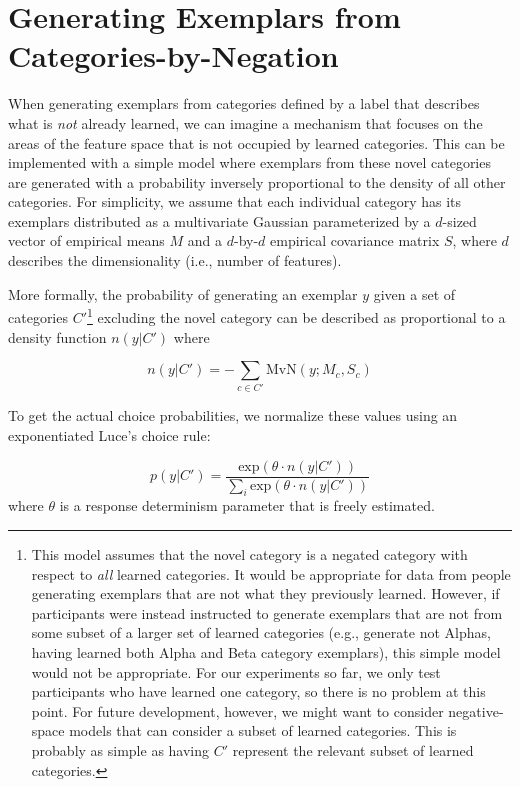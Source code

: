 \documentclass[12pt]{article} \usepackage[letterpaper, margin=1in,
\begin{document}
\section{Generating Exemplars from Categories-by-Negation}

When generating exemplars from categories defined by a label that describes what
is \emph{not} already learned, we can imagine a mechanism that focuses on the
areas of the feature space that is not occupied by learned categories. This can
be implemented with a simple model where exemplars from these novel categories
are generated with a probability inversely proportional to the density of all
other categories. For simplicity, we assume that each individual category has
its exemplars distributed as a multivariate Gaussian parameterized by a
$d$-sized vector of empirical means $M$ and a $d$-by-$d$ empirical covariance
matrix $S$, where $d$ describes the dimensionality (i.e., number of features).

More formally, the probability of generating an exemplar $y$ given a set of
categories $C'$\footnote{This model assumes that the novel category is a negated
  category with respect to \emph{all} learned categories. It would be
  appropriate for data from people generating exemplars that are not what they
  previously learned. However, if participants were instead instructed to
  generate exemplars that are not from some subset of a larger set of learned
  categories (e.g., generate not Alphas, having learned both Alpha and Beta
  category exemplars), this simple model would not be appropriate. For our
  experiments so far, we only test participants who have learned one category,
  so there is no problem at this point. For future development, however, we
  might want to consider negative-space models that can consider a subset of
  learned categories. This is probably as simple as having $C'$ represent the
  relevant subset of learned categories.} excluding the novel category can be described as
proportional to a density function $n(y|C')$ where

\begin{equation}\label{eq:negmech}
n(y|C') = -\sum_{c \in C'} \textrm{MvN}(y; M_c,S_c)
\end{equation}

To get the actual choice probabilities, we normalize these values using an
exponentiated Luce's choice rule:

\begin{equation}\label{eq:negluce}
p(y|C') = \dfrac
{\textrm{exp}(\theta \cdot n(y|C'))}
{\sum_i \textrm{exp}(\theta \cdot n(y|C'))}
\end{equation}
where $\theta$ is a response determinism parameter that is freely estimated. 
\end{document}
